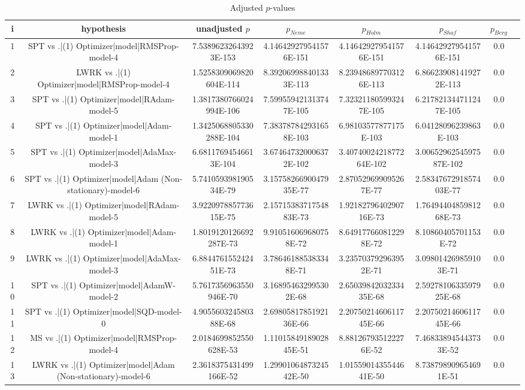 \documentclass[a3paper,10pt]{article}
\begin{document}
\begin{table}[!htp]
\centering\tiny
\caption{Adjusted $p$-values}
\begin{tabular}{cccccccc}
i&hypothesis&unadjusted $p$&$p_{Neme}$&$p_{Holm}$&$p_{Shaf}$&$p_{Berg}$\\
\hline
1&SPT vs .|(1) Optimizer|model|RMSProp-model-4&7.53896232643923E-153&4.146429279541576E-151&4.146429279541576E-151&4.146429279541576E-151&0.0\\
2&LWRK vs .|(1) Optimizer|model|RMSProp-model-4&1.5258309069820604E-114&8.392069988401333E-113&8.239486897703126E-113&6.866239081419272E-113&0.0\\
3&SPT vs .|(1) Optimizer|model|RAdam-model-5&1.3817380766024994E-106&7.599559421313747E-105&7.323211805993247E-105&6.217821344711247E-105&0.0\\
4&SPT vs .|(1) Optimizer|model|Adam-model-1&1.3425068805330288E-104&7.383787842931658E-103&6.98103577877175E-103&6.04128096239863E-103&0.0\\
5&SPT vs .|(1) Optimizer|model|AdaMax-model-3&6.68117694546613E-104&3.674647320006372E-102&3.4074002421877264E-102&3.0065296254597587E-102&0.0\\
6&SPT vs .|(1) Optimizer|model|Adam (Non-stationary)-model-6&5.741059398190534E-79&3.1575826690047935E-77&2.870529699095267E-77&2.5834767291857403E-77&0.0\\
7&LWRK vs .|(1) Optimizer|model|RAdam-model-5&3.922097885773615E-75&2.1571538371754883E-73&1.9218279640290716E-73&1.7649440485981268E-73&0.0\\
8&LWRK vs .|(1) Optimizer|model|Adam-model-1&1.8019120126692287E-73&9.910516069680758E-72&8.649177660812298E-72&8.10860405701153E-72&0.0\\
9&LWRK vs .|(1) Optimizer|model|AdaMax-model-3&6.884476155242451E-73&3.786461885383348E-71&3.235703792963952E-71&3.098014269859103E-71&0.0\\
10&SPT vs .|(1) Optimizer|model|AdamW-model-2&5.7617356963550946E-70&3.168954632995302E-68&2.6503984203233435E-68&2.5927810633597925E-68&0.0\\
11&SPT vs .|(1) Optimizer|model|SQD-model-0&4.905560324580388E-68&2.6980581785192136E-66&2.2075021460611745E-66&2.2075021460611745E-66&0.0\\
12&MS vs .|(1) Optimizer|model|RMSProp-model-4&2.0184699852550628E-53&1.1101584918902845E-51&8.881267935122276E-52&7.468338945443733E-52&0.0\\
13&LWRK vs .|(1) Optimizer|model|Adam (Non-stationary)-model-6&2.3618375431499166E-52&1.2990106487324542E-50&1.0155901435544641E-50&8.738798909654691E-51&0.0\\

\end{tabular}
\end{table}
\end{document}
